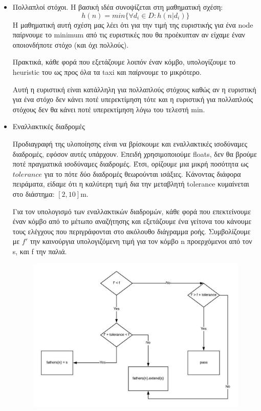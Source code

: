 \documentclass[a4paper,oneside, 11pt]{article}
\begin{document}
\begin{itemize}
\item Πολλαπλοί στόχοι. \bigbreak 
Η βασική ιδέα συνοψίζεται στη μαθηματική σχέση:
$$
h(n) = min\{ \forall d_i \in D: h(n | d_i) \}
$$
Η μαθηματική αυτή σχέση μας λέει ότι για την τιμή της ευριστικής για ένα node παίρνουμε το minimum από τις ευριστικές που θα προέκυπταν αν είχαμε έναν οποιονδήποτε στόχο (και όχι πολλούς). \bigbreak 

Πρακτικά, κάθε φορά που εξετάζουμε λοιπόν έναν κόμβο, υπολογίζουμε το heuristic του ως προς όλα τα taxi και παίρνουμε το μικρότερο. \bigbreak 

Αυτή η ευριστική είναι κατάλληλη για πολλαπλούς στόχους καθώς αν η ευριστική για ένα στόχο δεν κάνει ποτέ υπερεκτίμηση τότε και η ευριστική για πολλαπλούς στόχους δεν θα κάνει ποτέ υπερεκτίμηση λόγω του τελεστή min. \bigbreak 

\item Εναλλακτικές διαδρομές \bigbreak 

Προδιαγραφή της υλοποίησης είναι να βρίσκουμε και εναλλακτικές ισοδύναμες διαδρομές, εφόσον αυτές υπάρχουν. Επειδή χρησιμοποιούμε floats, δεν θα βρούμε ποτέ πραγματικά ισοδύναμες διαδρομές. Έτσι, ορίζουμε μια μικρή ποσότητα ως $tolerance$ για το πότε δύο διαδρομές θεωρούνται ισάξιες. Κάνοντας διάφορα πειράματα, είδαμε ότι η καλύτερη τιμή δια την μεταβλητή tolerance κυμαίνεται στο διάστημα:
$[2,10]$m. \bigbreak 

Για τον υπολογισμό των εναλλακτικών διαδρομών, κάθε φορά που επεκτείνουμε έναν κόμβο από το μέτωπο αναζήτησης και εξετάζουμε ένα γείτονα του κάνουμε τους ελέγχους που περιγράφονται στο ακόλουθο διάγραμμα ροής. Συμβολίζουμε με $f'$ την καινούργια υπολογιζόμενη τιμή για τον κόμβο n προερχόμενοι από τον s, και f την παλιά.

\begin{figure}[H]

\includegraphics[width=\textwidth]{diagramma_rois.jpeg}
\end{figure}

\end{itemize}
\end{document}
